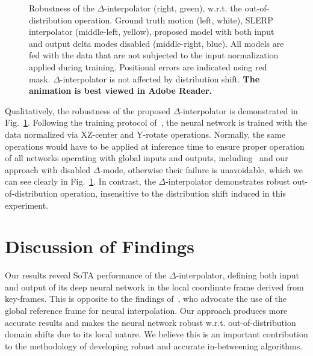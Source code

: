 \documentclass[letterpaper]{article} \usepackage[]{aaai23}  \usepackage{times}  \usepackage{helvet}  \usepackage{courier}  \usepackage[hyphens]{url}  \usepackage{graphicx} \urlstyle{rm} \def\UrlFont{\rm}  \usepackage{natbib}  \usepackage{caption} \frenchspacing  \setlength{\pdfpagewidth}{8.5in} \setlength{\pdfpageheight}{11in}
\begin{document}
\begin{figure}[!t]
    \centering
    \caption{Robustness of the $\Delta$-interpolator (right, green), w.r.t. the out-of-distribution operation. Ground truth motion (left, white), SLERP interpolator (middle-left, yellow), proposed model with both input and output delta modes disabled (middle-right, blue). All models are fed with the data that are not subjected to the input normalization applied during training. Positional errors are indicated using red mask. $\Delta$-interpolator is not affected by distribution shift. \textbf{The animation is best viewed in Adobe Reader.}}
    \label{fig:delta-Interpolator_robustness}
    \vspace{-2em}
\end{figure}


Qualitatively, the robustness of the proposed $\Delta$-interpolator is demonstrated in Fig.~\ref{fig:delta-Interpolator_robustness}. Following the training protocol of~\citet{harvey2020robust}, the neural network is trained with the data normalized via XZ-center and Y-rotate operations. Normally, the same operations would have to be applied at inference time to ensure proper operation of all networks operating with global inputs and outputs, including~\citep{harvey2020robust, duan2021singleshot} and our approach with disabled $\Delta$-mode, otherwise their failure is unavoidable, which we can see clearly in Fig.~\ref{fig:delta-Interpolator_robustness}. In contrast, the $\Delta$-interpolator demonstrates robust out-of-distribution operation, insensitive to the distribution shift induced in this experiment.





\section{Discussion of Findings} \label{sec:discussion_of_findings}
Our results reveal SoTA performance of the $\Delta$-interpolator, defining both input and output of its deep neural network in the local coordinate frame derived from key-frames. This is opposite to the findings of~\citet{duan2021singleshot}, who advocate the use of the global reference frame for neural interpolation. Our approach produces more accurate results and makes the neural network robust w.r.t. out-of-distribution domain shifts due to its local nature. We believe this is an important contribution to the methodology of developing robust and accurate in-betweening algorithms. 
\end{document}
